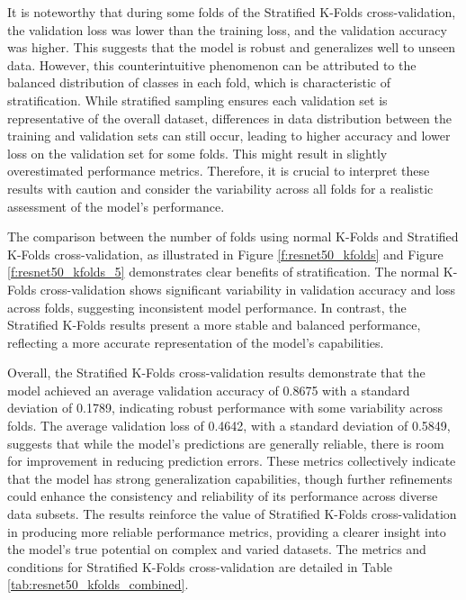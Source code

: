 It is noteworthy that during some folds of the Stratified K-Folds cross-validation, the validation loss was lower than the training loss, and the validation accuracy was higher. This suggests that the model is robust and generalizes well to unseen data. However, this counterintuitive phenomenon can be attributed to the balanced distribution of classes in each fold, which is characteristic of stratification. While stratified sampling ensures each validation set is representative of the overall dataset, differences in data distribution between the training and validation sets can still occur, leading to higher accuracy and lower loss on the validation set for some folds. This might result in slightly overestimated performance metrics. Therefore, it is crucial to interpret these results with caution and consider the variability across all folds for a realistic assessment of the model's performance.

The comparison between the number of folds using normal K-Folds and Stratified K-Folds cross-validation, as illustrated in Figure \ref{f:resnet50_kfolds} and Figure \ref{f:resnet50_kfolds_5} demonstrates clear benefits of stratification. The normal K-Folds cross-validation shows significant variability in validation accuracy and loss across folds, suggesting inconsistent model performance. In contrast, the Stratified K-Folds results present a more stable and balanced performance, reflecting a more accurate representation of the model's capabilities.

Overall, the Stratified K-Folds cross-validation results demonstrate that the model achieved an average validation accuracy of 0.8675 with a standard deviation of 0.1789, indicating robust performance with some variability across folds. The average validation loss of 0.4642, with a standard deviation of 0.5849, suggests that while the model's predictions are generally reliable, there is room for improvement in reducing prediction errors. These metrics collectively indicate that the model has strong generalization capabilities, though further refinements could enhance the consistency and reliability of its performance across diverse data subsets. The results reinforce the value of Stratified K-Folds cross-validation in producing more reliable performance metrics, providing a clearer insight into the model's true potential on complex and varied datasets. The metrics and conditions for Stratified K-Folds cross-validation are detailed in Table \ref{tab:resnet50_kfolds_combined}.

